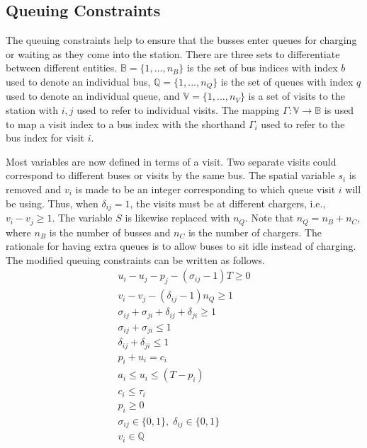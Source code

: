 \documentclass[utf8]{FrontiersinHarvard}
\begin{document}
\subsection{Queuing Constraints}
\label{sec:queuing}
\noindent
The queuing constraints help to ensure that the busses enter queues for charging or waiting as they come into the station. There are three sets to differentiate between different entities. $\mathbb{B} = \{1, ..., n_B\}$ is the set of bus indices with index $b$ used to denote an individual bus, $\mathbb{Q} = \{1, ..., n_Q\}$ is the set of queues with index $q$ used to denote an individual queue, and $\mathbb{V} = \{1, ..., n_V\}$ is a set of visits to the station with $i,j$ used to refer to individual visits. The mapping $\Gamma: \mathbb{V} \rightarrow \mathbb{B}$ is used to map a visit index to a bus index with the shorthand $\Gamma_i$ used to refer to the bus index for visit $i$.

Most variables are now defined in terms of a visit. Two separate visits could correspond to different buses or visits by the same bus. The spatial variable $s_i$ is removed and $v_i$ is made to be an integer corresponding to which queue visit $i$ will be using. Thus, when $\delta_{ij} = 1$, the visits must be at different chargers, i.e., $v_i-v_j \geq 1$. The variable $S$ is likewise replaced with $n_Q$. Note that $n_Q = n_B + n_C$, where $n_B$ is the number of busses and $n_C$ is the number of chargers. The rationale for having extra queues is to allow buses to sit idle instead of charging. The modified queuing constraints can be written as follows.
\begin{subequations}
\label{eq:packconstrs}
\begin{align}
    u_i - u_j - p_j - (\sigma_{ij} - 1)T \geq 0                      \label{subeq:time}         \\
    v_i - v_j - (\delta_{ij} - 1)n_Q \geq 1                            \label{subeq:space}        \\
    \sigma_{ij} + \sigma_{ji} + \delta_{ij} + \delta_{ji} \geq 1     \label{subeq:valid_pos}    \\
    \sigma_{ij} + \sigma_{ji} \leq 1                                 \label{subeq:sigma}        \\
    \delta_{ij} + \delta_{ji} \leq 1                                 \label{subeq:delta}        \\
    p_i + u_i = c_i                                                  \label{subeq:detach}       \\
    a_i \leq u_i \leq (T - p_i)                                      \label{subeq:valid_starts} \\
    c_i \leq \tau_i                                                  \label{subeq:valid_depart} \\
    p_i \geq 0                                                       \label{subeq:pos_charge} \\
    \sigma_{ij} \in \{0,1\},\;\delta_{ij} \in \{0,1\}                \label{subeq:sdspace}      \\
    v_i \in \mathbb{Q}                                           \label{subeq:vspace}
\end{align}
\end{subequations}
\end{document}
